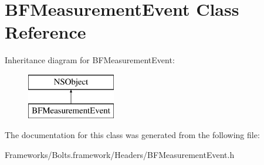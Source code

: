 \hypertarget{interface_b_f_measurement_event}{}\section{B\+F\+Measurement\+Event Class Reference}
\label{interface_b_f_measurement_event}
Inheritance diagram for B\+F\+Measurement\+Event\+:\begin{figure}[H]
\begin{center}
\leavevmode
\includegraphics[height=2.000000cm]{interface_b_f_measurement_event}
\end{center}
\end{figure}


The documentation for this class was generated from the following file\+:\begin{DoxyCompactItemize}
\item 
Frameworks/\+Bolts.\+framework/\+Headers/B\+F\+Measurement\+Event.\+h\end{DoxyCompactItemize}
